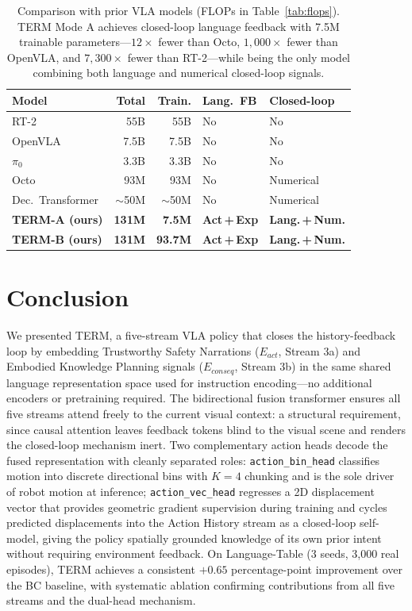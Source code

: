 \documentclass[letterpaper]{article} %
\begin{document}
\begin{table}[t]
\centering
\setlength{\tabcolsep}{4pt}
\small
\begin{tabular}{p{2.8cm}rrll}
\toprule
\textbf{Model} & \textbf{Total} & \textbf{Train.} & \textbf{Lang.\ FB} & \textbf{Closed-loop} \\
\midrule
RT-2 \cite{brohan2023rt2} & 55B & 55B & No & No \\
OpenVLA \cite{kim2024openvla} & 7.5B & 7.5B & No & No \\
$\pi_0$ \cite{black2024pi0} & 3.3B & 3.3B & No & No \\
Octo \cite{octo2024} & 93M & 93M & No & Numerical \\
Dec.\ Transformer \cite{chen2021decision} & ${\sim}$50M & ${\sim}$50M & No & Numerical \\
\midrule
\textbf{TERM-A (ours)} & \textbf{131M} & \textbf{7.5M} & \textbf{Act\,+\,Exp} & \textbf{Lang.\,+\,Num.} \\
\textbf{TERM-B (ours)} & \textbf{131M} & \textbf{93.7M} & \textbf{Act\,+\,Exp} & \textbf{Lang.\,+\,Num.} \\
\bottomrule
\end{tabular}
\caption{Comparison with prior VLA models (FLOPs in Table~\ref{tab:flops}). TERM Mode A achieves closed-loop language feedback with 7.5M trainable parameters---$12\times$ fewer than Octo, $1{,}000\times$ fewer than OpenVLA, and $7{,}300\times$ fewer than RT-2---while being the only model combining both language and numerical closed-loop signals.}
\label{tab:comparison}
\end{table}

\section{Conclusion}

We presented TERM, a five-stream VLA policy that closes the history-feedback loop by embedding Trustworthy Safety Narrations ($E_{act}$, Stream 3a) and Embodied Knowledge Planning signals ($E_{conseq}$, Stream 3b) in the same shared language representation space used for instruction encoding---no additional encoders or pretraining required. The bidirectional fusion transformer ensures all five streams attend freely to the current visual context: a structural requirement, since causal attention leaves feedback tokens blind to the visual scene and renders the closed-loop mechanism inert. Two complementary action heads decode the fused representation with cleanly separated roles: \texttt{action\_bin\_head} classifies motion into discrete directional bins with $K{=}4$ chunking and is the sole driver of robot motion at inference; \texttt{action\_vec\_head} regresses a 2D displacement vector that provides geometric gradient supervision during training and cycles predicted displacements into the Action History stream as a closed-loop self-model, giving the policy spatially grounded knowledge of its own prior intent without requiring environment feedback. On Language-Table (3 seeds, 3,000 real episodes), TERM achieves a consistent $+0.65$ percentage-point improvement over the BC baseline, with systematic ablation confirming contributions from all five streams and the dual-head mechanism.
\end{document}
